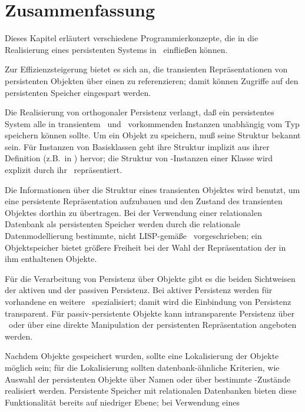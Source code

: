 \section{Zusammenfassung}
%
Dieses Kapitel erl\"{a}utert verschiedene Programmierkonzepte, die in
die Realisierung eines persistenten Systems in \clos\ einflie\ss{}en
k\"{o}nnen.
%
\par Zur Effizienzsteigerung bietet es sich an, die transienten
Repr\"{a}sentationen von persistenten Objekten \"{u}ber einen \cache\/ zu
referenzieren; damit k\"{o}nnen Zugriffe auf den persistenten Speicher
eingespart werden.
%
\par{}Die Realisierung von orthogonaler Persistenz verlangt, da\ss{} ein
persistentes System alle in transientem \cl\ und \clos\ vorkommenden
Instanzen unabh\"{a}ngig vom Typ speichern k\"{o}nnen sollte. Um ein Objekt
zu speichern, mu\ss{} seine Struktur bekannt sein. F\"{u}r Instanzen von
Basisklassen geht ihre Struktur implizit aus ihrer Definition
(z.B.\ in \cite{bib:st90}) hervor; die Struktur von \clos-Instanzen
einer Klasse wird explizit durch ihr \clsmo\ repr\"{a}sentiert.
%
\par{}Die Informationen \"{u}ber die Struktur eines transienten Objektes
wird benutzt, um eine persistente Repr\"{a}sentation aufzubauen und den
Zustand des transienten Objektes dorthin zu \"{u}ber\-tra\-gen. Bei der
Verwendung einer relationalen Datenbank als persistenten Speicher werden
durch die relationale Datenmodellierung bestimmte, nicht LISP-gem\"{a}\ss{}e
\representationforms\ vorgeschrieben; ein Objektspeicher bietet
gr\"{o}\ss{}ere Freiheit bei der Wahl der Repr\"{a}sentation der in ihm
enthaltenen Objekte.
%
\par{}F\"{u}r die Verarbeitung von Persistenz \"{u}ber Objekte gibt es die
beiden Sichtweisen der aktiven und der passiven Persistenz. Bei
aktiver Persistenz werden f\"{u}r vorhandene \gfn{}en weitere
\mtd[n]\ spezialisiert; damit wird die Einbindung von Persistenz
transparent. F\"{u}r passiv-persistente Objekte kann intransparente
Persistenz \"{u}ber \swizzling\ oder \"{u}ber eine direkte Manipulation der
persistenten Repr\"{a}sentation angeboten werden.
%
\par{}Nachdem Objekte gespeichert wurden, sollte eine Lokalisierung
der Objekte m\"{o}glich sein; f\"{u}r die Lokalisierung sollten
datenbank-\"{a}hnliche Kriterien, wie Auswahl der persistenten Objekte
\"{u}ber Namen oder \"{u}ber bestimmte \Slt\/-Zust\"{a}nde realisiert werden.
Persistente Speicher mit relationalen Datenbanken bieten diese
Funktionalit\"{a}t bereits auf niedriger Ebene; bei Verwendung eines
